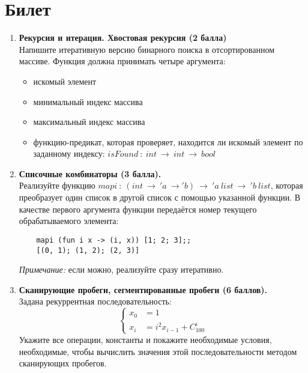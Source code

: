 \documentclass[a4paper,11pt]{article}
\renewcommand{\emph}[1]{\textit{#1}}
\newcommand{\<}{\langle}
\renewcommand{\>}{\rangle}
\begin{document}
\section*{Билет }
\begin{enumerate}
\item \textbf{Рекурсия и итерация. Хвостовая рекурсия (2 балла)}\\
  Напишите итеративную версию бинарного поиска в отсортированном массиве.
  Функция должна принимать четыре аргумента:
  \begin{itemize}
  \item искомый элемент
  \item минимальный индекс массива
  \item максимальный индекс массива
  \item функцию-предикат, которая проверяет, находится ли искомый элемент по
    заданному индексу: $isFound~:~int~\rightarrow~int~\rightarrow~bool$
  \end{itemize}

\item \textbf{Списочные комбинаторы (3 балла).}\\
  Реализуйте функцию $mapi~:~(int~\rightarrow~'\!a~\rightarrow
  '\!b)~\rightarrow~'\!a~list~\rightarrow~'\!b~list$, которая преобразует один
  список в другой список с помощью указанной функции. В качестве первого
  аргумента функции передаётся номер текущего обрабатываемого элемента:
  \begin{lstlisting}
    mapi (fun i x -> (i, x)) [1; 2; 3];;
    [(0, 1); (1, 2); (2, 3)]
  \end{lstlisting}
  \emph{Примечание:} если можно, реализуйте сразу итеративно.

\item \textbf{Сканирующие пробеги, сегментированные пробеги (6 баллов).}\\
  Задана рекуррентная последовательность:
  $$\left\{
  \begin{aligned}
    x_0 &= 1 \\
    x_i &= i^2 x_{i-1} + C_{100}^i
  \end{aligned}
  \right.$$
  Укажите все операции, константы и покажите необходимые условия, необходимые,
  чтобы вычислить значения этой последовательности методом сканирующих пробегов.
\end{enumerate}
\newpage
\end{document}
